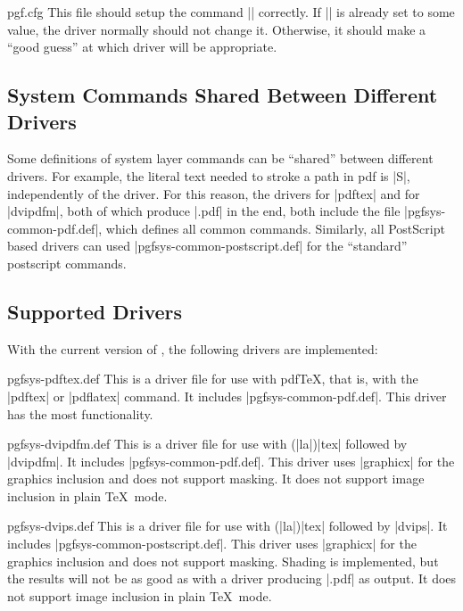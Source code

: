 \begin{filedescription}{pgf.cfg}
  This file should setup the command |\pgfsysdriver| correctly. If
  |\pgfsysdriver| is already set to some value, the driver normally
  should not change it. Otherwise, it should make a ``good guess'' at
  which driver will be appropriate.
\end{filedescription}



\subsection{System Commands Shared Between Different Drivers}

Some definitions of system layer commands can be ``shared'' between
different drivers. For example, the literal text needed to stroke a
path in pdf is |S|, independently of the driver. For this reason,
the drivers for |pdftex| and for |dvipdfm|, both of which produce
|.pdf| in the end, both include the file |pgfsys-common-pdf.def|,
which defines all common commands. Similarly, all PostScript based
drivers can used |pgfsys-common-postscript.def| for the ``standard''
postscript commands.


\subsection{Supported Drivers}

With the current version of \pgfname, the following drivers are
implemented:

\begin{filedescription}{pgfsys-pdftex.def}
  This is a driver file for use with pdf\TeX, that is, with the
  |pdftex| or |pdflatex| command. It includes
  |pgfsys-common-pdf.def|. This driver has the most functionality. 
\end{filedescription}

\begin{filedescription}{pgfsys-dvipdfm.def}
  This is a driver file for use with (|la|)|tex| followed by |dvipdfm|. It
  includes |pgfsys-common-pdf.def|. This driver uses |graphicx| for the
  graphics inclusion and does not support masking. It does not
  support image inclusion in plain \TeX\ mode.
\end{filedescription}

\begin{filedescription}{pgfsys-dvips.def}
  This is a driver file for use with (|la|)|tex| followed by
  |dvips|. It includes |pgfsys-common-postscript.def|. This driver
  uses |graphicx| for the graphics inclusion and does not support
  masking. Shading is implemented, but the results will not be
  as good as with a driver producing |.pdf| as output. It does not
  support image inclusion in plain \TeX\ mode.
\end{filedescription}


